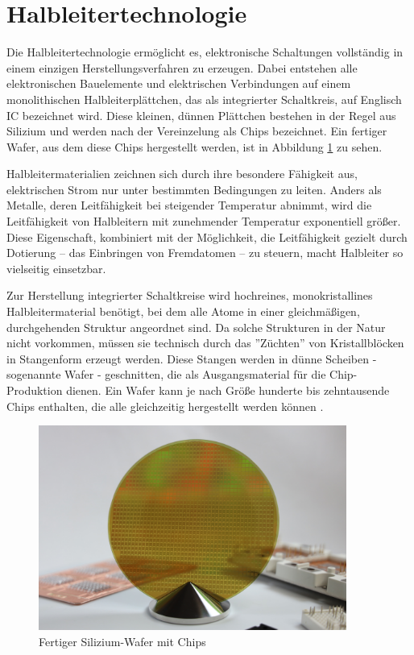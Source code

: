 \section{Halbleitertechnologie}

Die Halbleitertechnologie ermöglicht es, elektronische Schaltungen vollständig in einem einzigen Herstellungsverfahren zu erzeugen. Dabei entstehen alle elektronischen Bauelemente und elektrischen Verbindungen auf einem monolithischen Halbleiterplättchen, das als integrierter Schaltkreis, auf Englisch \gls{IC} bezeichnet wird. Diese kleinen, dünnen Plättchen bestehen in der Regel aus Silizium und werden nach der Vereinzelung als Chips bezeichnet. Ein fertiger Wafer, aus dem diese Chips hergestellt werden, ist in Abbildung \ref{fig:Silizium-Wafer} zu sehen.

Halbleitermaterialien zeichnen sich durch ihre besondere Fähigkeit aus, elektrischen Strom nur unter bestimmten Bedingungen zu leiten. Anders als Metalle, deren Leitfähigkeit bei steigender Temperatur abnimmt, wird die Leitfähigkeit von Halbleitern mit zunehmender Temperatur exponentiell größer. Diese Eigenschaft, kombiniert mit der Möglichkeit, die Leitfähigkeit gezielt durch Dotierung – das Einbringen von Fremd\-atomen – zu steuern, macht Halbleiter so vielseitig einsetzbar.

Zur Herstellung integrierter Schaltkreise wird hochreines, monokristallines Halbleitermaterial benötigt, bei dem alle Atome in einer gleichmäßigen, durchgehenden Struktur angeordnet sind. Da solche Strukturen in der Natur nicht vorkommen, müssen sie technisch durch das ''Züchten'' von Kristallblöcken in Stangenform erzeugt werden. Diese Stangen werden in dünne Scheiben - sogenannte Wafer - geschnitten, die als Ausgangsmaterial für die Chip-Produktion dienen. Ein Wafer kann je nach Größe hunderte bis zehntausende Chips enthalten, die alle gleichzeitig hergestellt werden können \cite{lienig2023halbleitertechnologie}.

\begin{figure}[!h]
    \centering
    \includegraphics[width=0.9\textwidth]{bilder/SiC-Wafer-Infineon.jpg}
    \caption{Fertiger Silizium-Wafer mit Chips \cite{infineon2024dünnsterWafer}}
    \label{fig:Silizium-Wafer}
\end{figure}

